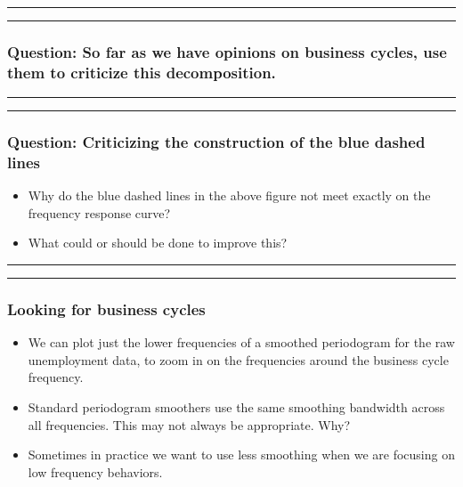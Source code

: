 \documentclass[]{article}
\begin{document}
\begin{center}\rule{0.5\linewidth}{\linethickness}\end{center}

\begin{center}\rule{0.5\linewidth}{\linethickness}\end{center}

\subsubsection{Question: So far as we have opinions on business cycles,
use them to criticize this
decomposition.}\label{question-so-far-as-we-have-opinions-on-business-cycles-use-them-to-criticize-this-decomposition.}

\begin{center}\rule{0.5\linewidth}{\linethickness}\end{center}

\begin{center}\rule{0.5\linewidth}{\linethickness}\end{center}

\subsubsection{Question: Criticizing the construction of the blue dashed
lines}\label{question-criticizing-the-construction-of-the-blue-dashed-lines}

\begin{itemize}
\item
  Why do the blue dashed lines in the above figure not meet exactly on
  the frequency response curve?
\item
  What could or should be done to improve this?
\end{itemize}

\begin{center}\rule{0.5\linewidth}{\linethickness}\end{center}

\begin{center}\rule{0.5\linewidth}{\linethickness}\end{center}

\subsubsection{Looking for business
cycles}\label{looking-for-business-cycles}

\begin{itemize}
\item
  We can plot just the lower frequencies of a smoothed periodogram for
  the raw unemployment data, to zoom in on the frequencies around the
  business cycle frequency.
\item
  Standard periodogram smoothers use the same smoothing bandwidth across
  all frequencies. This may not always be appropriate. Why?
\item
  Sometimes in practice we want to use less smoothing when we are
  focusing on low frequency behaviors.
\end{itemize}
\end{document}
